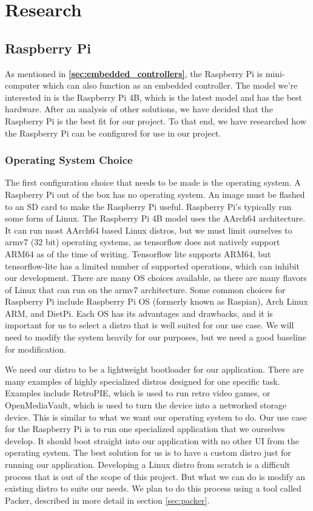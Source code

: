 \section{Research}

\subsection{Raspberry Pi}

As mentioned in \textbf{\ref{sec:embedded_controllers}},
the Raspberry Pi is mini-computer which can also function as an embedded controller. The
model we're interested in is the Raspberry Pi 4B, which is the latest model and has the
best hardware. After an analysis of other solutions, we have decided that the
Raspberry Pi is the best fit for our project. To that end, we have researched how the
Raspberry Pi can be configured for use in our project.

\subsubsection{Operating System Choice}

The first configuration choice that needs to be made is the operating system. A Raspberry
Pi out of the box has no operating system. An image must be flashed to an SD card to make
the Raspberry Pi useful. Raspberry Pi's typically run some form of Linux. The Raspberry Pi
4B model uses the AArch64 architecture. It can run most AArch64 based Linux distros, but
we must limit ourselves to armv7 (32 bit) operating systems, as tensorflow does not
natively support ARM64 as of the time of writing. Tensorflow lite supports ARM64, but
tensorflow-lite has a limited number of supported operations, which can inhibit our
development. There are many OS choices available, as there are many flavors of Linux that
can run on the armv7 architecture. Some common choices for Raspberry Pi include Raspberry
Pi OS (formerly known as Raspian), Arch Linux ARM, and DietPi. Each OS has its advantages
and drawbacks, and it is important for us to select a distro that is well suited for our
use case. We will need to modify the system heavily for our purposes, but we need a good
baseline for modification.

We need our distro to be a lightweight bootloader for our application. There are many
examples of highly specialized distros designed for one specific task. Examples
include RetroPIE, which is used to run retro video games, or OpenMediaVault, which is used
to turn the device into a networked storage device. This is similar to what we want our
operating system to do. Our use case for the Raspberry Pi is to run one specialized
application that we ourselves develop. It should boot straight into our application with
no other UI from the operating system. The best solution for us is to have a custom distro
just for running our application. Developing a Linux distro from scratch is a difficult
process that is out of the scope of this project. But what we can do is modify an existing
distro to suite our needs. We plan to do this process using a tool called Packer,
described in more detail in section \ref{sec:packer}.

